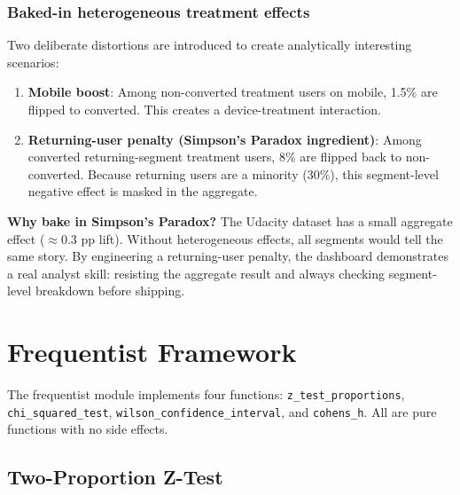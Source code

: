 \subsubsection{Baked-in heterogeneous treatment effects}

Two deliberate distortions are introduced to create analytically interesting
scenarios:

\begin{enumerate}
  \item \textbf{Mobile boost}: Among non-converted treatment users on mobile,
    1.5\% are flipped to converted. This creates a device-treatment interaction.
  \item \textbf{Returning-user penalty (Simpson's Paradox ingredient)}:
    Among converted returning-segment treatment users, 8\% are flipped back
    to non-converted. Because returning users are a minority (30\%), this
    segment-level negative effect is masked in the aggregate.
\end{enumerate}

\begin{decisionbox}
  \textbf{Why bake in Simpson's Paradox?} The Udacity dataset has a small
  aggregate effect ($\approx 0.3$ pp lift). Without heterogeneous effects, all
  segments would tell the same story. By engineering a returning-user
  penalty, the dashboard demonstrates a real analyst skill: resisting the
  aggregate result and always checking segment-level breakdown before shipping.
\end{decisionbox}

\section{Frequentist Framework}
\label{sec:abtest-frequentist}


The frequentist module implements four functions: \texttt{z\_test\_proportions},
\texttt{chi\_squared\_test}, \texttt{wilson\_confidence\_interval}, and
\texttt{cohens\_h}. All are pure functions with no side effects.

\subsection{Two-Proportion Z-Test}

